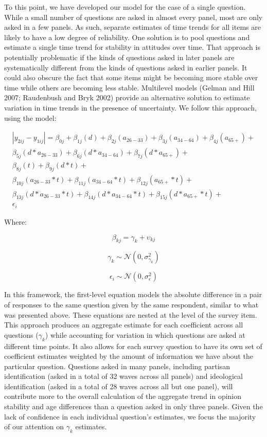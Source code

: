 \documentclass[
  12pt,
]{article}
\begin{document}
To this point, we have developed our model for the case of a single question. While a small number of questions are asked in almost every panel, most are only asked in a few panels. As such, separate estimates of time trends for all items are likely to have a low degree of reliability. One solution is to pool questions and estimate a single time trend for stability in attitudes over time. That approach is potentially problematic if the kinds of questions asked in later panels are systematically different from the kinds of questions asked in earlier panels. It could also obscure the fact that some items might be becoming more stable over time while others are becoming less stable. Multilevel models (Gelman and Hill 2007; Raudenbush and Bryk 2002) provide an alternative solution to estimate variation in time trends in the presence of uncertainty. We follow this approach, using the model:

\begin{equation*}
 \begin{aligned}
   |y_{2ij}-y_{1ij} | = \beta_{0j} + \beta_{1j}(d) + \beta_{2j}(a_{26-33}) + \beta_{3j}(a_{34-64}) + \beta_{4j}(a_{65+}) + \\ 
   \beta_{5j}(d*a_{26-33}) + \beta_{6j}(d*a_{34-64}) + \beta_{7j}(d*a_{65+}) + \\
   \beta_{8j}(t) + \beta_{9j}(d*t) + \\
   \beta_{10j}(a_{26-33}*t) + \beta_{11j}(a_{34-64}*t) + \beta_{12j}(a_{65+}*t) + \\
   \beta_{13j}(d*a_{26-33}*t) + \beta_{14j}(d*a_{34-64}*t) + \beta_{15j}(d*a_{65+}*t) + \\
   \epsilon_i
 \end{aligned}
 \end{equation*}

Where:

\[ \beta_{kj} = \gamma_k + \upsilon_{kj} \]

\[ \gamma_k \sim \mathcal{N}(0,\sigma_{\gamma_k}^2) \]

\[ \epsilon_i \sim \mathcal{N}(0,\sigma_{\epsilon}^2) \]

In this framework, the first-level equation models the absolute difference in a pair of responses to the same question given by the same respondent, similar to what was presented above. These equations are nested at the level of the survey item. This approach produces an aggregate estimate for each coefficient across all questions (\(\gamma_k\)) while accounting for variation in which questions are asked at different time points. It also allows for each survey question to have its own set of coefficient estimates weighted by the amount of information we have about the particular question. Questions asked in many panels, including partisan identification (asked in a total of 32 waves across all panels) and ideological identification (asked in a total of 28 waves across all but one panel), will contribute more to the overall calculation of the aggregate trend in opinion stability and age differences than a question asked in only three panels. Given the lack of confidence in each individual question's estimates, we focus the majority of our attention on \(\gamma_k\) estimates.
\end{document}
